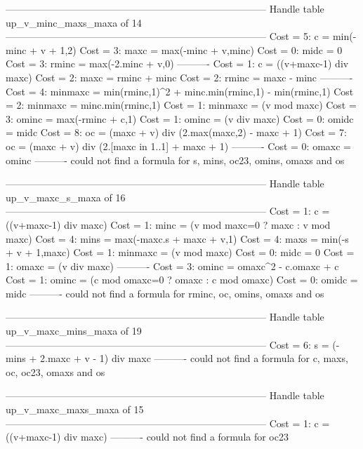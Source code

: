 --------------------------------------------------------------------------------
Handle table up_v_minc_maxs_maxa of 14
--------------------------------------------------------------------------------
Cost =  5:  c       = min(-minc + v + 1,2)
Cost =  3:  maxc    = max(-minc + v,minc)
Cost =  0:  midc    = 0
Cost =  3:  rminc   = max(-2.minc + v,0)
----------
Cost =  1:  c       = ((v+maxc-1) div maxc)
Cost =  2:  maxc    = rminc + minc
Cost =  2:  rminc   = maxc - minc
----------
Cost =  4:  minmaxc = min(rminc,1)^2 + minc.min(rminc,1) - min(rminc,1)
Cost =  2:  minmaxc = minc.min(rminc,1)
Cost =  1:  minmaxc = (v mod maxc)
Cost =  3:  ominc   = max(-rminc + c,1)
Cost =  1:  ominc   = (v div maxc)
Cost =  0:  omidc   = midc
Cost =  8:  oc      = (maxc + v) div (2.max(maxc,2) - maxc + 1)
Cost =  7:  oc      = (maxc + v) div (2.[maxc in 1..1] + maxc + 1)
----------
Cost =  0:  omaxc   = ominc
----------
could not find a formula for s, mins, oc23, omins, omaxs and os


--------------------------------------------------------------------------------
Handle table up_v_maxc_s_maxa of 16
--------------------------------------------------------------------------------
Cost =  1:  c       = ((v+maxc-1) div maxc)
Cost =  1:  minc    = (v mod maxc=0 ? maxc : v mod maxc)
Cost =  4:  mins    = max(-maxc.s + maxc + v,1)
Cost =  4:  maxs    = min(-s + v + 1,maxc)
Cost =  1:  minmaxc = (v mod maxc)
Cost =  0:  midc    = 0
Cost =  1:  omaxc   = (v div maxc)
----------
Cost =  3:  ominc   = omaxc^2 - c.omaxc + c
Cost =  1:  ominc   = (c mod omaxc=0 ? omaxc : c mod omaxc)
Cost =  0:  omidc   = midc
----------
could not find a formula for rminc, oc, omins, omaxs and os


--------------------------------------------------------------------------------
Handle table up_v_maxc_mins_maxa of 19
--------------------------------------------------------------------------------
Cost =  6:  s     = (-mins + 2.maxc + v - 1) div maxc
----------
could not find a formula for c, maxs, oc, oc23, omaxs and os


--------------------------------------------------------------------------------
Handle table up_v_maxc_maxs_maxa of 15
--------------------------------------------------------------------------------
Cost =  1:  c    = ((v+maxc-1) div maxc)
----------
could not find a formula for oc23



